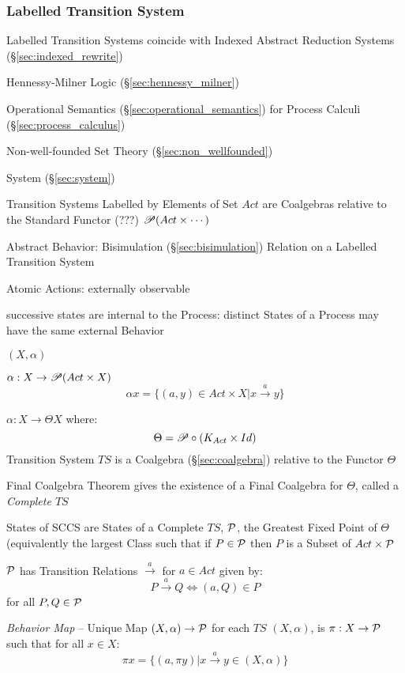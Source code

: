 \subsubsection{Labelled Transition System}
\label{sec:labelled_transition}

Labelled Transition Systems coincide with Indexed Abstract Reduction
Systems (\S\ref{sec:indexed_rewrite})

Hennessy-Milner Logic (\S\ref{sec:hennessy_milner})


Operational Semantics (\S\ref{sec:operational_semantics}) for Process
Calculi (\S\ref{sec:process_calculus})

Non-well-founded Set Theory (\S\ref{sec:non_wellfounded})

System (\S\ref{sec:system})

Transition Systems Labelled by Elements of Set $Act$ are Coalgebras
relative to the Standard Functor (???) $\mathscr{P}(Act \times \cdots)$
\cite{aczel88}

Abstract Behavior: Bisimulation (\S\ref{sec:bisimulation}) Relation on
a Labelled Transition System \cite{aczel88}

Atomic Actions: externally observable

successive states are internal to the Process: distinct States of a
Process may have the same external Behavior \cite{aczel88}

$(X,\alpha)$

$\alpha : X \rightarrow \mathscr{P}(Act \times X)$
\[
  \alpha x = \{(a,y) \in Act \times X | x \xrightarrow{a} y\}
\]

$\alpha : X \rightarrow \Theta X$ where:
\[
  \Theta = \mathscr{P} \circ (K_{Act} \times Id)
\]
Transition System $TS$ is a Coalgebra (\S\ref{sec:coalgebra}) relative
to the Functor $\Theta$

Final Coalgebra Theorem gives the existence of a Final Coalgebra for
$\Theta$, called a \emph{Complete $TS$}

States of SCCS are States of a Complete $TS$, $\mathcal{P}$, the
Greatest Fixed Point of $\Theta$ (equivalently the largest Class such
that if $P \in \mathcal{P}$ then $P$ is a Subset of $Act \times
\mathcal{P}$

$\mathcal{P}$ has Transition Relations $\xrightarrow{a}$ for $a \in Act$
given by:
\[
  P \xrightarrow{a} Q \Leftrightarrow (a,Q) \in P
\]
for all $P,Q \in \mathcal{P}$

\emph{Behavior Map} -- Unique Map $(X,\alpha) \rightarrow \mathcal{P}$
for each $TS$ $(X,\alpha)$, is $\pi : X \rightarrow \mathcal{P}$ such
that for all $x \in X$:
\[
  \pi x = \{(a,\pi y) | x \xrightarrow{a} y \in (X,\alpha)\}
\]

